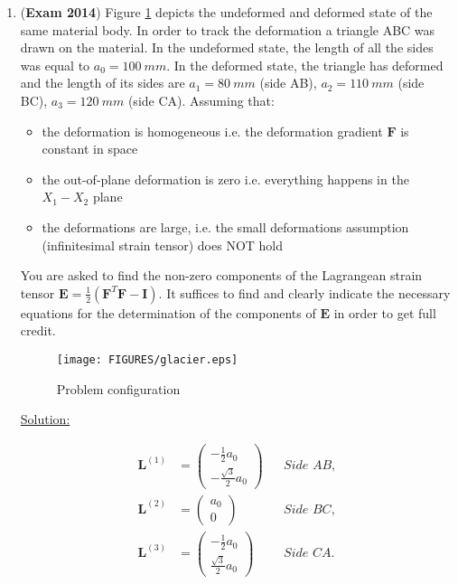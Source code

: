 \documentclass{article}
\newcommand{\bi}{\begin{itemize}}
\newcommand{\ei}{\end{itemize}}
\newcommand{\bs}{\boldsymbol}
\newif\ifsolution
\begin{document}
\begin{enumerate}
\newpage
\item (\textbf{Exam 2014}) Figure \ref{fig:glacier} depicts the undeformed and deformed state of the same material
body. In order to track the deformation a triangle ABC was drawn on the material. In the undeformed state, the length
of all the sides was equal to $a_0=100~mm$. In the deformed state, the triangle has deformed and the length of its
sides are $a_1=80~mm$ (side AB), $a_2=110~mm$ (side BC), $a_3=120~mm$ (side CA).
Assuming that:
\bi
\item the deformation is homogeneous i.e. the deformation gradient $\bs{F}$ is constant in space
\item the out-of-plane deformation is zero i.e. everything happens in the $X_1-X_2$ plane
\item the deformations are large, i.e. the small deformations assumption (infinitesimal strain tensor) does NOT hold
\ei
You are asked to find the non-zero components of the Lagrangean strain tensor $\bs{E}=\frac{1}{2}(\bs{F}^T
\bs{F}-\bs{I})$.  It suffices to find and clearly indicate the necessary equations for the determination of the
components of $\bs{E}$ in order to get full credit.

\begin{figure}[!h]

\centering
  \texttt{[image: FIGURES/glacier.eps]}
 \caption{Problem configuration}
 \label{fig:glacier}
\end{figure}

\ifsolution
\underline{Solution:}

\begin{align}
\bs L^{(1)} &= 
\begin{pmatrix}
-\frac{1}{2} a_0\\
-\frac{\sqrt{3}}{2} a_0
\end{pmatrix}
&&\textit{Side $AB$}, \\
\bs L^{(2)} &= 
\begin{pmatrix}
 a_0\\
0
\end{pmatrix}
&&\textit{Side $BC$}, \\
\bs L^{(3)} &= 
\begin{pmatrix}
-\frac{1}{2} a_0\\
\frac{\sqrt{3}}{2} a_0
\end{pmatrix}
&&\textit{Side $CA$}.
\end{align}


\end{enumerate}
\end{document}
